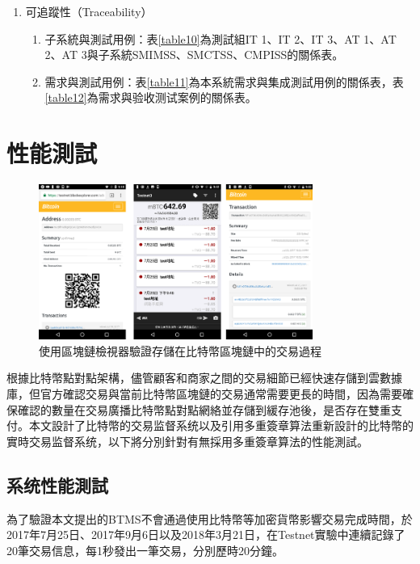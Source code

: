 \begin{enumerate}
			\item 可追蹤性（Traceability）

						

			\begin{enumerate}
				\item 子系統與測試用例：表\ref{table10}為測試組IT 1、IT 2、IT 3、AT 1、AT 2、AT 3與子系統SMIMSS、SMCTSS、CMPISS的關係表。
				\item 需求與測試用例：表\ref{table11}為本系統需求與集成測試用例的關係表，表\ref{table12}為需求與验收测试案例的關係表。
				\end{enumerate}
		\end{enumerate}


	\section{性能測試}


		\begin{figure}[!htbp]
			\centering
			\includegraphics[width = 0.8\textwidth]{fig9.png}
			\caption{使用區塊鏈檢視器驗證存儲在比特幣區塊鏈中的交易過程}\label{fig9}
		\end{figure}


		根據比特幣點對點架構，儘管顧客和商家之間的交易細節已經快速存儲到雲數據庫，但官方確認交易與當前比特幣區塊鏈的交易通常需要更長的時間，因為需要確保確認的數量在交易廣播比特幣點對點網絡並存儲到緩存池後，是否存在雙重支付。本文設計了比特幣的交易监督系统以及引用多重簽章算法重新設計的比特幣的實時交易监督系统，以下將分別針對有無採用多重簽章算法的性能測試。


		\subsection{系统性能測試}
		為了驗證本文提出的BTMS不會通過使用比特幣等加密貨幣影響交易完成時間，於2017年7月25日、2017年9月6日以及2018年3月21日，在Testnet實驗中連續記錄了20筆交易信息，每1秒發出一筆交易，分別歷時20分鐘。

